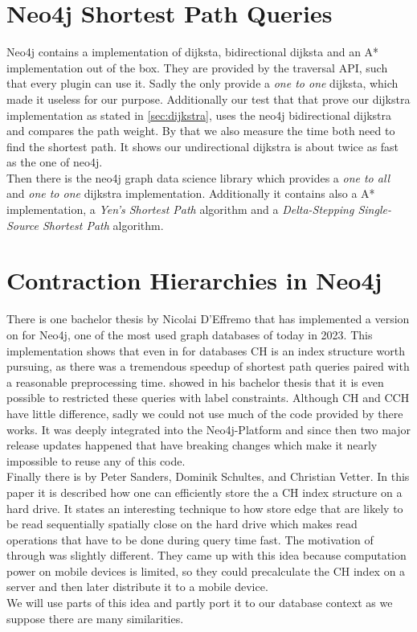 \section{Neo4j Shortest Path Queries}

Neo4j contains a implementation of dijksta, bidirectional dijksta and an A* implementation out of the box. They are provided by the traversal API, such that every plugin can use it. 
Sadly the only provide a \textit{one to one} dijksta, which made it useless for our purpose. Additionally our test that that prove our dijkstra implementation as stated in \ref{sec:dijkstra}, uses the neo4j bidirectional dijkstra and compares the path weight.
By that we also measure the time both need to find the shortest path. It shows our undirectional dijkstra is about twice as fast as the one of neo4j.
\\
Then there is the neo4j graph data science library  which provides a \textit{one to all} and \textit{one to one} dijkstra implementation. Additionally it contains also a A* implementation, a \textit{Yen’s Shortest Path} algorithm and a \textit{Delta-Stepping Single-Source Shortest Path} algorithm.


\section{Contraction Hierarchies in Neo4j}\label{sec:related_work:database}

There is one bachelor thesis by Nicolai D'Effremo \cite[Some text]{DEffremo2019} that has implemented a version on \cite[Contraction Hierarchies]{Geisberger_2012} for Neo4j, one 
of the most used graph databases of today in 2023. This implementation shows that even in for databases CH is an index structure worth pursuing, as there was a tremendous speedup 
of shortest path queries paired with a reasonable preprocessing time. \cite{Zickenberg2021} showed in his bachelor thesis that it is even possible to restricted these
queries with label constraints. Although CH and CCH have little difference, sadly we could not use much of the code provided by there works. It
was deeply integrated into the Neo4j-Platform and since then two major release updates happened that have breaking changes which make it nearly impossible to reuse any of
this code.\\

Finally there is \cite[Mobile Route Planning]{Sanders} by Peter Sanders, Dominik Schultes, and Christian Vetter. In this paper it is described how one can efficiently store
the a CH index structure on a hard drive. It states an interesting technique to how store edge that are likely to be read sequentially spatially close on the hard drive which 
makes read operations that have to be done during query time fast. The motivation of \cite[Mobile Route Planning]{Sanders} through was slightly different. They came up with this
idea because computation power on mobile devices is limited, so they could precalculate the CH index on a server and then later distribute it to a mobile device.
\\
We will use parts of this idea and partly port it to our database context as we suppose there are many similarities.
